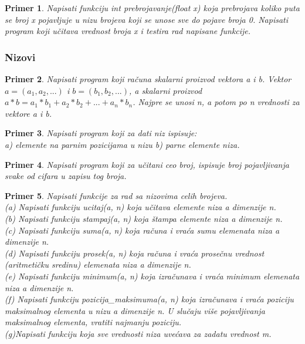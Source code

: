 \documentclass[a4paper]{article}
\newtheorem{primer}{Primer}[section]
\begin{document}
\begin{primer}

Napisati funkciju int prebrojavanje(float x) koja prebrojava
koliko puta se broj x pojavljuje u nizu brojeva koji se unose sve do pojave
broja 0. Napisati program koji učitava vrednost broja x i testira rad napisane
funkcije.
\end{primer}

\subsubsection{Nizovi}

\begin{primer}
Napisati program koji računa skalarni proizvod vektora a i b. Vektor $a=(a_1, a_2,...)$ i $b=(b_1, b_2,...)$, a skalarni proizvod $a*b= a_1 * b_1 + a_2 * b_2 + ... + a_n * b_n$. Najpre se unosi n, a potom po n vrednosti za vektore a i b. 
\end{primer}

\begin{primer}
Napisati program koji za dati niz ispisuje:\\
a) elemente na parnim pozicijama u nizu
b) parne elemente niza.
\end{primer}

\begin{primer}
Napisati program koji za učitani ceo broj, ispisuje broj
pojavljivanja svake od cifara u zapisu tog broja.
\end{primer}


\begin{primer}
Napisati funkcije za rad sa nizovima celih brojeva.\\
(a) Napisati funkciju ucitaj(a, n) koja učitava elemente niza a dimenzije n.\\
(b) Napisati funkciju stampaj(a, n) koja štampa elemente niza a dimenzije n.\\
(c) Napisati funkciju suma(a, n) koja računa i vraća sumu
elemenata niza a dimenzije n.\\
(d) Napisati funkciju prosek(a, n) koja računa i vraća prosečnu
vrednost (aritmetičku sredinu) elemenata niza a dimenzije n.\\
(e) Napisati funkciju minimum(a, n) koja izračunava i vraća
minimum elemenata niza a dimenzije n.\\
(f) Napisati funkciju pozicija\_maksimuma(a, n) koja izračunava
i vraća poziciju maksimalnog elementa u nizu a dimenzije n. U slučaju
više pojavljivanja maksimalnog elementa, vratiti najmanju poziciju.\\
(g)Napisati funkciju koja sve vrednosti niza uvećava za zadatu vrednost m.
\end{primer}
\end{document}
